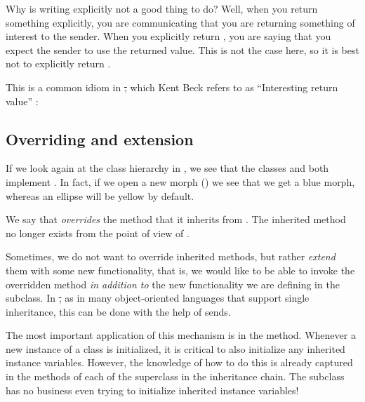 \documentclass[a4paper,10pt,twoside]{book}
\begin{document}
Why is writing  explicitly not a good thing to do?
Well, when you return something explicitly, you are communicating that you are returning something of interest to the sender.
When you explicitly return \self, you are saying that you expect the sender to use the returned value.
This is not the case here, so it is best not to explicitly return \self.

This is a common idiom in \st, which Kent Beck refers to as ``Interesting return value'' \cite{Beck97a}:


\subsection{Overriding and extension}

If we look again at the  class hierarchy in , we see that the classes  and \mbox{} both implement .
In fact, if we open a new morph () we see that we get a blue morph, whereas an ellipse will be yellow by default.

We say that  \emph{overrides} the  method that it inherits from .
The inherited method no longer exists from the point of view of .

Sometimes, we do not want to override inherited methods, but rather \emph{extend} them with some new functionality, that is, we would like to be able to invoke the overridden method \emph{in addition to} the new functionality we are defining in the subclass.
In \st, as in many object-oriented languages that support single inheritance, this can be done with the help of \super sends.

The most important application of this mechanism is in the  method.
Whenever a new instance of a class is initialized, it is critical to also initialize any inherited instance variables.
However, the knowledge of how to do this is already captured in the  methods of each of the superclass in the inheritance chain.
The subclass has no business even trying to initialize inherited instance variables!
\end{document}
